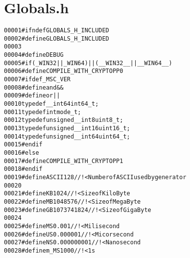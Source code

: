 \hypertarget{Globals_8h_source}{
\section{Globals.h}
}


\begin{footnotesize}\begin{alltt}
00001 \textcolor{preprocessor}{#ifndef GLOBALS\_H\_INCLUDED}
00002 \textcolor{preprocessor}{}\textcolor{preprocessor}{#define GLOBALS\_H\_INCLUDED}
00003 \textcolor{preprocessor}{}
00004 \textcolor{preprocessor}{    #define DEBUG}
00005 \textcolor{preprocessor}{}\textcolor{preprocessor}{    #if ( \_WIN32 || \_WIN64 ) || ( \_\_WIN32\_\_ || \_\_WIN64\_\_ )}
00006 \textcolor{preprocessor}{}\textcolor{preprocessor}{        #define COMPILE\_WITH\_CRYPTOPP 0}
00007 \textcolor{preprocessor}{}\textcolor{preprocessor}{        #ifdef \_MSC\_VER}
00008 \textcolor{preprocessor}{}\textcolor{preprocessor}{            #define and &&}
00009 \textcolor{preprocessor}{}\textcolor{preprocessor}{            #define or ||}
00010 \textcolor{preprocessor}{}            \textcolor{keyword}{typedef} \_\_int64 int64\_t;
00011             \textcolor{keyword}{typedef} \textcolor{keywordtype}{int} mode\_t;
00012             \textcolor{keyword}{typedef} \textcolor{keywordtype}{unsigned} \_\_int8 uint8\_t;
00013             \textcolor{keyword}{typedef} \textcolor{keywordtype}{unsigned} \_\_int16 uint16\_t;
00014             \textcolor{keyword}{typedef} \textcolor{keywordtype}{unsigned} \_\_int64 uint64\_t;
00015 \textcolor{preprocessor}{        #endif}
00016 \textcolor{preprocessor}{}\textcolor{preprocessor}{    #else}
00017 \textcolor{preprocessor}{}\textcolor{preprocessor}{        #define COMPILE\_WITH\_CRYPTOPP 1}
00018 \textcolor{preprocessor}{}\textcolor{preprocessor}{    #endif}
00019 \textcolor{preprocessor}{}\textcolor{preprocessor}{    #define ASCII 128 //!< Number of ASCII used by generator}
00020 \textcolor{preprocessor}{}
00021 \textcolor{preprocessor}{    #define KB 1024 //!<Size of KiloByte}
00022 \textcolor{preprocessor}{}\textcolor{preprocessor}{    #define MB 1048576 //!<Size of MegaByte}
00023 \textcolor{preprocessor}{}\textcolor{preprocessor}{    #define GB 1073741824 //!<Size of GigaByte}
00024 \textcolor{preprocessor}{}
00025 \textcolor{preprocessor}{    #define MS 0.001 //!< Milisecond}
00026 \textcolor{preprocessor}{}\textcolor{preprocessor}{    #define US 0.000001 //!< Micorsecond}
00027 \textcolor{preprocessor}{}\textcolor{preprocessor}{    #define NS 0.000000001 //!< Nanosecond}
00028 \textcolor{preprocessor}{}\textcolor{preprocessor}{    #define m\_MS 1000 //!< 1s}

\end{alltt}
\end{footnotesize}
